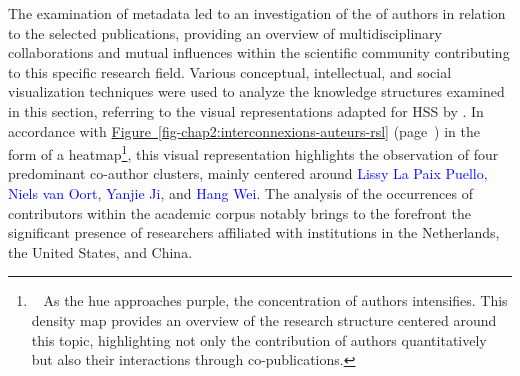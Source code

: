 \begin{refsegment}
The examination of metadata led to an investigation of the  of authors in relation to the selected publications, providing an overview of multidisciplinary collaborations and mutual influences within the scientific community contributing to this specific research field. Various conceptual, intellectual, and social visualization techniques \textcolor{blue}{\autocite[559]{fortuna_global_2020}} were used to analyze the knowledge structures examined in this section, referring to the visual representations adapted for \acrshort{HSS} by \textcolor{blue}{\textcite[94-97]{ballouk_analyse_2021}}. In accordance with \hyperref[fig-chap2:interconnexions-auteurs-rsl]{Figure~\ref{fig-chap2:interconnexions-auteurs-rsl}} (page~\pageref{fig-chap2:interconnexions-auteurs-rsl}) in the form of a heatmap\footnote{~
    As the hue approaches purple, the concentration of authors intensifies. This density map provides an overview of the research structure centered around this topic, highlighting not only the contribution of authors quantitatively but also their interactions through co-publications.
}, this visual representation highlights the observation of four predominant co-author clusters, mainly centered around \textcolor{blue}{Lissy La Paix Puello}, \textcolor{blue}{Niels van Oort}, \textcolor{blue}{Yanjie Ji}, and \textcolor{blue}{Hang Wei}. The analysis of the occurrences of contributors within the academic corpus notably brings to the forefront the significant presence of researchers affiliated with institutions in the Netherlands, the United States, and China.
    \begin{customitemize}

\end{customitemize}
\end{refsegment}
